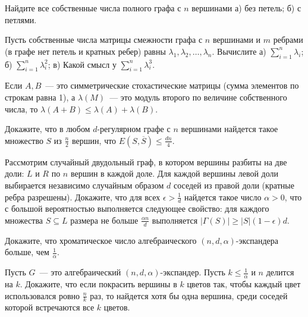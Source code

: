 \setcounter{curtask}{1}


\begin{task}
    Найдите все собственные числа полного графа с $n$ вершинами 
	а) без петель; б) с петлями.
\end{task}

\begin{task}
    Пусть собственные числа матрицы смежности графа с $n$ вершинами и 
	$m$ ребрами (в графе нет петель и кратных ребер) равны 
	$\lambda_1, \lambda_2, \dots, \lambda_n$. Вычислите 
	а) $\sum_{i=1}^n \lambda_i$; б) $\sum_{i=1}^n \lambda_i^2$;
	в) Какой смысл у $\sum_{i=1}^n \lambda_i^3$.
\end{task}

\begin{task}
    Если $A, B$~--- это симметрические стохастические матрицы (сумма элементов
	по строкам равна 1), а $\lambda(M)$~--- это модуль второго по величине
	собственного числа, то $\lambda(A + B) \le \lambda(A) + \lambda(B)$.
\end{task}

\begin{task}
	Докажите, что в любом $d$-регулярном графе с $n$ вершинами найдется такое
    множество $S$ из $\frac{n}{2}$ вершин, что $E(S,\overline{S})\le \frac{dn}{4}$.
\end{task}

\begin{task}
    Рассмотрим случайный двудольный граф, в котором вершины разбиты на две доли: $L$
	и $R$ по $n$ вершин в каждой доле. Для каждой вершины левой доли выбирается
	независимо случайным образом $d$ соседей из правой доли (кратные ребра
	разрешены). Докажите, что для всех $\epsilon > \frac{1}{d}$ найдется такое число
	$\alpha>0$, что с большой вероятностью выполняется следующее свойство: для
    каждого множества $S \subseteq L$ размера не больше $\frac{\alpha n}{d}$
    выполняется $|\Gamma(S)| \ge |S|(1 - \epsilon)d$.
\end{task}

\begin{task}
    Докажите, что хроматическое число алгебраического $(n,d,\alpha)$-экспандера
    больше, чем $\frac{1}{\alpha}$.
\end{task}

\begin{task}
    Пусть $G$~--- это алгебраический $(n,d,\alpha)$-экспандер. Пусть 
	$k\le \frac{1}{\alpha}$ и $n$ делится на $k$. Докажите, что если покрасить
    вершины  в $k$ цветов так, чтобы каждый цвет использовался ровно $\frac{n}{k}$
	раз, то найдется хотя бы одна вершина, среди соседей которой встречаются все $k$
    цветов.
\end{task}